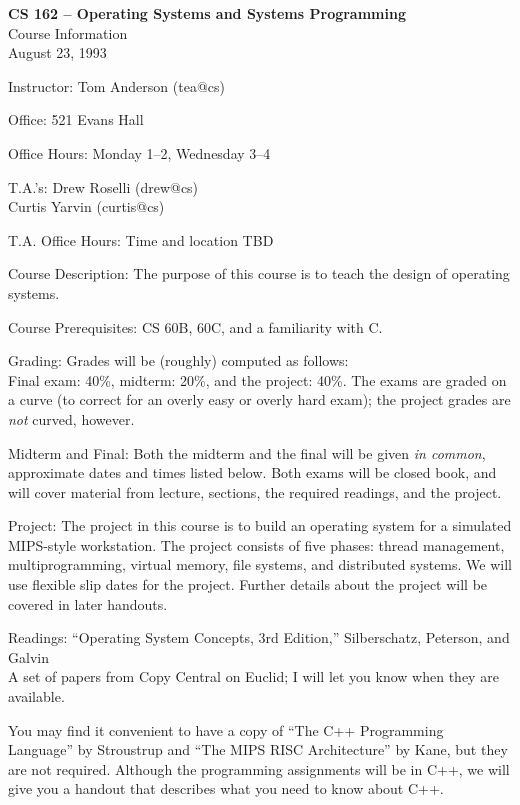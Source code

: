

\begin{center}
\large
{\bf CS 162 -- Operating Systems and Systems Programming}\\
Course Information\\
August 23, 1993
\end{center}

\begin{description}

\item{Instructor:}  Tom Anderson (tea@cs)
\item{Office:} 521 Evans Hall
\item{Office Hours:} Monday 1--2, Wednesday 3--4 

\item{T.A.'s:} Drew Roselli (drew@cs)\\
Curtis Yarvin (curtis@cs)

\item{T.A. Office Hours:} Time and location TBD

\item{Course Description:}
The purpose of this course is to teach the design of operating systems.

\item{Course Prerequisites:} CS 60B, 60C, and a familiarity with C.

\item{Grading:} Grades will be (roughly) computed as follows:\\
Final exam: 40\%, midterm: 20\%, and the project: 40\%.
The exams are graded on a curve (to correct for an overly easy or
overly hard exam); the project grades are {\em not} curved, however.

\item{Midterm and Final:} Both the midterm and the final will be given 
{\em in common}, approximate dates and times listed below.  
Both exams will be closed book, and will cover material from 
lecture, sections, the required readings, and the project.

\item{Project:}  The project in this course is to build an operating 
system for a simulated MIPS-style
workstation.  The project consists of five phases: thread management,
multiprogramming, virtual memory, file systems, and distributed systems.
We will use flexible slip dates for the project.
Further details about the project will be covered in later handouts.

\item{Readings:} ``Operating System Concepts, 3rd Edition,'' Silberschatz, Peterson, and Galvin\\
A set of papers from Copy Central on Euclid; I will let you know when they
are available.

You may find it convenient to have a copy of ``The C++ Programming
Language'' by Stroustrup and ``The MIPS RISC Architecture'' by Kane,
but they are not required.  Although the programming assignments
will be in C++, we will give you a handout that describes what
you need to know about C++.

\end{description}
\newpage

